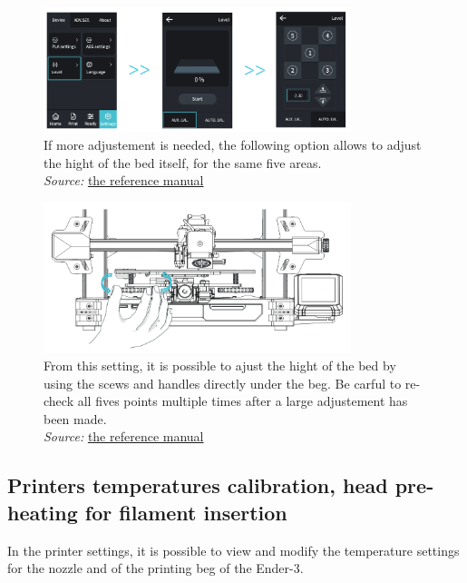 \documentclass[a4paper,11pt]{article}
\begin{document}
\begin{figure}[H]
    \centering 
    \includegraphics[width=0.8\textwidth]{img/ender/3a.png} 
    \caption{If more adjustement is needed, the following option allows to adjust the hight of the bed itself, for the same five areas.\\ 
    \textit{Source:} \href{https://img.staticdj.com/8f39f619af6bf34e5afb36ddbf2a0229.pdf?spm=..page\_1995605.download\_support\_1.1\&spm\_prev=..product\_5e45abfb-4541-4c92-ba93-cfba9a1e3ea4.nav\_link\_store\_1.1}{the reference manual}}
    \label{fig:ender3a}
\end{figure}

\begin{figure}[H]
    \centering 
    \includegraphics[width=0.8\textwidth]{img/ender/3b.png} 
    \caption{From this setting, it is possible to ajust the hight of the bed by using the scews and handles directly under the beg. Be carful to re-check all fives points multiple times after a large adjustement has been made.\\ 
    \textit{Source:} \href{https://img.staticdj.com/8f39f619af6bf34e5afb36ddbf2a0229.pdf?spm=..page\_1995605.download\_support\_1.1\&spm\_prev=..product\_5e45abfb-4541-4c92-ba93-cfba9a1e3ea4.nav\_link\_store\_1.1}{the reference manual}}
    \label{fig:ender3b}
\end{figure}


\subsection{Printers temperatures calibration, head pre-heating for filament insertion}
In the printer settings, it is possible to view and modify the temperature settings for the nozzle and of the printing beg of the Ender-3.
\end{document}
